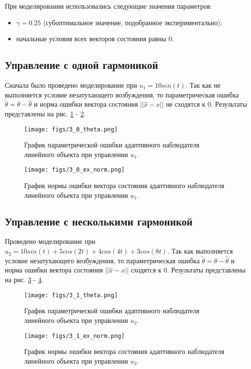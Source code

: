 \documentclass{article}
\begin{document}
При моделировании использовались следующие значения параметров: 
\begin{itemize}
  \item $\gamma=0.25$ (субоптимальное значение, подобранное экспериментально);
  \item начальные условия всех векторов состояния равны 0.
\end{itemize}

\newpage
\subsection{Управление с одной гармоникой}
Сначала было проведено моделирование при \(u_1 = 10 sin(t)\). 
Так как не выполняется условие незатухающего возбуждения, то параметрическая ошибка \(\tilde \theta = \theta - \hat \theta\) и норма ошибки вектора состояния \(||\hat x - x||\) не сходятся к 0. 
Результаты представлены на рис. \ref{fig:1_theta} - \ref{fig:1_xnorm}.
\begin{figure}[h!]
  \centering
  \texttt{[image: figs/3\_0\_theta.png]}
  \caption{График параметрической ошибки адаптивного наблюдателя линейного объекта при управлении \(u_1\).} 
  \label{fig:1_theta}
\end{figure}
\begin{figure}[h!]
  \centering
  \texttt{[image: figs/3\_0\_ex\_norm.png]}
  \caption{График нормы ошибки вектора состояния адаптивного наблюдателя линейного объекта при управлении \(u_1\).} 
  \label{fig:1_xnorm}
\end{figure}
\FloatBarrier
\newpage

\subsection{Управление с несколькими гармоникой}
Проведено моделирование при \(u_2 = 10 sin(t) + 5 cos(2t) + 4cos(4t) + 3cos(8t)\). 
Так как выполняется условие незатухающего возбуждения, то параметрическая ошибка \(\tilde \theta = \theta - \hat \theta\) и норма ошибки вектора состояния \(||\hat x - x||\) сходятся к 0. 
Результаты представлены на рис. \ref{fig:2_theta} - \ref{fig:2_xnorm}.
\begin{figure}[h!]
  \centering
  \texttt{[image: figs/3\_1\_theta.png]}
  \caption{График параметрической ошибки адаптивного наблюдателя линейного объекта при управлении \(u_2\).} 
  \label{fig:2_theta}
\end{figure}
\begin{figure}[h!]
  \centering
  \texttt{[image: figs/3\_1\_ex\_norm.png]}
  \caption{График нормы ошибки вектора состояния адаптивного наблюдателя линейного объекта при управлении \(u_2\).} 
  \label{fig:2_xnorm}
\end{figure}
\FloatBarrier
\newpage
\end{document}
